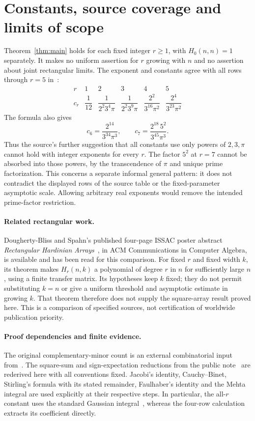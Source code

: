 \documentclass[11pt]{article}
\theoremstyle{remark}
\begin{document}
\section{Constants, source coverage and limits of scope}

Theorem~\ref{thm:main} holds for each fixed integer $r\ge1$, with
$H_0(n,n)=1$ separately. It makes no uniform assertion for $r$ growing with
$n$ and no assertion about joint rectangular limits. The exponent and
constants agree with all rows through $r=5$ in~\cite[p.~12]{dk}:
\[
\begin{array}{c|ccccc}
r&1&2&3&4&5\\[2pt]\hline
c_r&\dfrac1{12}&\dfrac1{2^2 3^4\pi}&\dfrac1{2^2 3^9\pi}
&\dfrac{2^2}{3^{16}\pi^2}&\dfrac{2^4}{3^{23}\pi^2}
\end{array}
\]
The formula also gives
\[
 c_6=\frac{2^{14}}{3^{34}\pi^3},\qquad
 c_7=\frac{2^{18}\,5^2}{3^{45}\pi^3}.
\]
Thus the source's further suggestion that all constants use only powers of
$2,3,\pi$ cannot hold with integer exponents for every $r$. The factor $5^2$
at $r=7$ cannot be absorbed into those powers, by the transcendence of $\pi$
and unique prime factorization. This concerns a separate informal general
pattern: it does not contradict the displayed rows of the source table or
the fixed-parameter asymptotic scale. Allowing arbitrary real exponents
would remove the intended prime-factor restriction.

\paragraph{Related rectangular work.}
Dougherty-Bliss and Spahn's published four-page ISSAC poster abstract
\emph{Rectangular Hardinian Arrays}~\cite{ds}, in ACM Communications in
Computer Algebra, is available and has been read for this comparison.
For fixed $r$ and fixed width $k$, its theorem makes $H_r(n,k)$ a polynomial
of degree $r$ in $n$ for sufficiently large $n$, using a finite transfer
matrix. Its hypotheses keep $k$ fixed; they do not permit substituting
$k=n$ or give a uniform threshold and asymptotic estimate in growing $k$.
That theorem therefore does not supply the square-array result proved here.
This is a comparison of specified sources, not certification of worldwide
publication priority.

\paragraph{Proof dependencies and finite evidence.}
The original complementary-minor count is an external combinatorial input
from~\cite{dk}. The square-sum and sign-expectation reductions from the
public note~\cite{prior} are rederived here with all conventions fixed.
Jacobi's identity, Cauchy--Binet, Stirling's formula with its stated remainder,
Faulhaber's identity and the Mehta integral are used explicitly at their
respective steps. In particular, the all-$r$ constant uses the standard
Gaussian integral~\cite{fw}, whereas the four-row calculation extracts its
coefficient directly.
\end{document}
